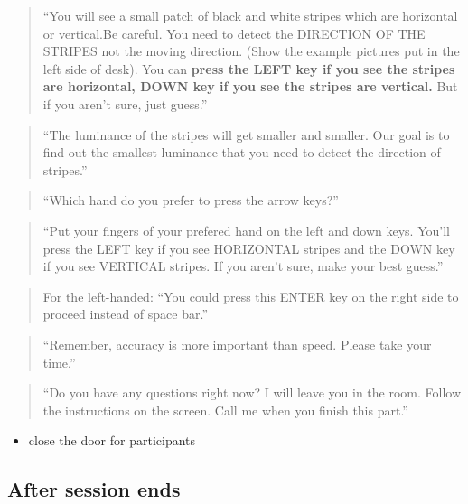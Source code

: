 \documentclass[]{article}
\providecommand{\tightlist}{%
  \setlength{\itemsep}{0pt}\setlength{\parskip}{0pt}}
\begin{document}
\begin{quote}
``You will see a small patch of black and white stripes which are
horizontal or vertical.Be careful. You need to detect the DIRECTION OF
THE STRIPES not the moving direction. (Show the example pictures put in
the left side of desk). You can \textbf{press the LEFT key if you see
the stripes are horizontal, DOWN key if you see the stripes are
vertical.} But if you aren't sure, just guess.''
\end{quote}

\begin{quote}
``The luminance of the stripes will get smaller and smaller. Our goal is
to find out the smallest luminance that you need to detect the direction
of stripes.''
\end{quote}

\begin{quote}
``Which hand do you prefer to press the arrow keys?''
\end{quote}

\begin{quote}
``Put your fingers of your prefered hand on the left and down keys.
You'll press the LEFT key if you see HORIZONTAL stripes and the DOWN key
if you see VERTICAL stripes. If you aren't sure, make your best guess.''
\end{quote}

\begin{quote}
For the left-handed: ``You could press this ENTER key on the right side
to proceed instead of space bar.''
\end{quote}

\begin{quote}
``Remember, accuracy is more important than speed. Please take your
time.''
\end{quote}

\begin{quote}
``Do you have any questions right now? I will leave you in the room.
Follow the instructions on the screen. Call me when you finish this
part.''
\end{quote}

\begin{itemize}
\tightlist
\item
  close the door for participants
\end{itemize}

\hypertarget{after-session-ends}{%
\subsection{After session ends}\label{after-session-ends}}
\end{document}
